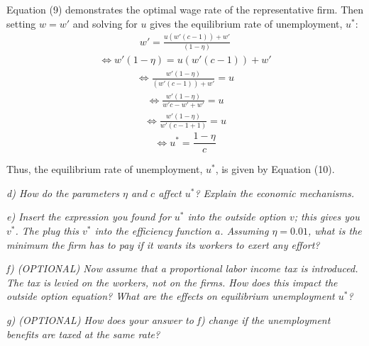 \documentclass[11pt]{article} %
\begin{document}
\bigskip
Equation (9) demonstrates the optimal wage rate of the representative firm. Then setting $w=w'$ and solving for $u$ gives the equilibrium rate of unemployment, $u^*$:
\begin{align*}
    w' = \frac{u\left(w'(c-1)\right) + w'} {(1 - \eta)}
\end{align*}
\begin{align*}
   \Longleftrightarrow w'(1 - \eta) = {u\left(w'(c-1)\right) + w'} 
\end{align*}
\begin{align*}
    \Longleftrightarrow \frac {w'(1 -\eta)} {\left(w'(c-1)\right) + w'} = {u} 
\end{align*}
\begin{align*}
    \Longleftrightarrow \frac {w'(1 -\eta)} {w'c-w' + w'} = {u} 
\end{align*}
\begin{align*}
    \Longleftrightarrow \frac {w'(1 -\eta)} {w'(c-1+1)} = {u} 
\end{align*}
\begin{equation}
    \Longleftrightarrow u^* = \frac {1 -\eta} {c}
\end{equation}

\bigskip
Thus, the equilibrium rate of unemployment, $u^*$, is given by Equation (10).



\pagebreak
\textit{d) How do the parameters $\eta$ and $c$ affect $u^*$? Explain the economic mechanisms.}




\pagebreak
\textit{e) Insert the expression you found for $u^*$ into the outside option $v$; this
gives you $v^*$. The plug this $v^*$ into the efficiency function $a$. Assuming
$\eta=0.01$, what is the minimum the firm has to pay if it wants its
workers to exert any effort?}




\pagebreak
\textit{f) (OPTIONAL) Now assume that a proportional labor income tax is
introduced. The tax is levied on the workers, not on the firms. How
does this impact the outside option equation? What are the effects on
equilibrium unemployment $u^*$?}




\pagebreak
\textit{g) (OPTIONAL) How does your answer to f) change if the unemployment
benefits are taxed at the same rate?}
\end{document}
